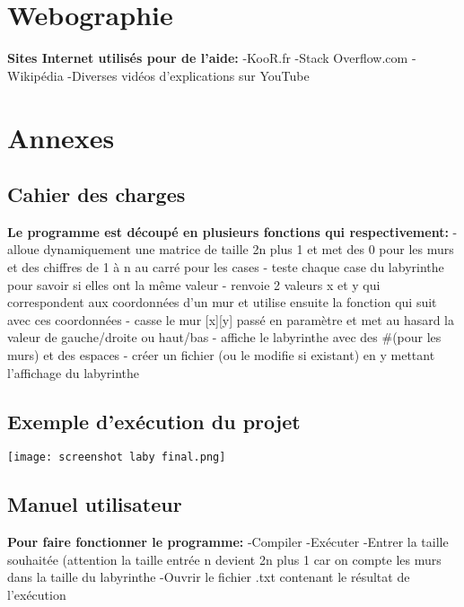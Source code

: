 \documentclass{article}
\begin{document}
\section{Webographie}
\textbf{Sites Internet utilisés pour de l'aide:}\newline
-KooR.fr\newline
-Stack Overflow.com\newline
-Wikipédia\newline
-Diverses vidéos d'explications sur YouTube


\section{Annexes}
\subsection{Cahier des charges}
 \textbf{Le programme est découpé en plusieurs fonctions qui respectivement:}\newline
- alloue dynamiquement une matrice de taille 2n plus 1 et met des 0 pour les murs et des chiffres de 1 à n au carré pour les cases\newline
- teste chaque case du labyrinthe pour savoir si elles ont la même valeur\newline 
- renvoie 2 valeurs x et y qui correspondent aux coordonnées d’un mur et utilise ensuite la fonction qui suit avec ces coordonnées\newline
- casse le mur [x][y] passé en paramètre et met au hasard la valeur de gauche/droite ou haut/bas\newline
- affiche le labyrinthe avec des \#(pour les murs) et des espaces\newline
- créer un fichier (ou le modifie si existant) en y mettant l’affichage du labyrinthe\newline

\subsection{Exemple d'exécution du projet}
\texttt{[image: screenshot laby final.png]}
\subsection{Manuel utilisateur}
\textbf{Pour faire fonctionner le programme:}\newline
-Compiler\newline
-Exécuter\newline
-Entrer la taille souhaitée (attention la taille entrée n devient 2n plus 1 car on compte les murs dans la taille du labyrinthe\newline
-Ouvrir le fichier .txt contenant le résultat de l'exécution
\end{document}
